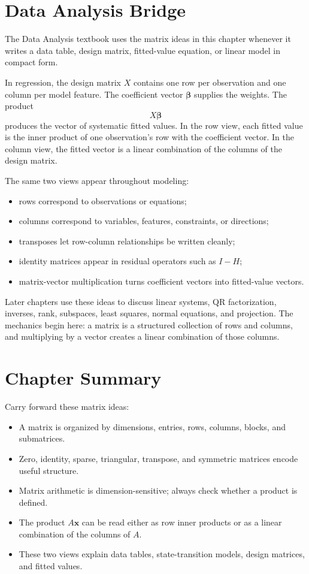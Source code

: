 \section{Data Analysis Bridge}
\label{mf:ch07-data-analysis-bridge}

The Data Analysis textbook uses the matrix ideas in this chapter whenever it writes a data table, design matrix, fitted-value equation, or linear model in compact form.

In regression, the design matrix \(X\) contains one row per observation and one column per model feature. The coefficient vector \(\boldsymbol{\beta}\) supplies the weights. The product
\[
    X\boldsymbol{\beta}
\]
produces the vector of systematic fitted values. In the row view, each fitted value is the inner product of one observation's row with the coefficient vector. In the column view, the fitted vector is a linear combination of the columns of the design matrix.

The same two views appear throughout modeling:
\begin{itemize}
    \item rows correspond to observations or equations;
    \item columns correspond to variables, features, constraints, or directions;
    \item transposes let row-column relationships be written cleanly;
    \item identity matrices appear in residual operators such as \(I-H\);
    \item matrix-vector multiplication turns coefficient vectors into fitted-value vectors.
\end{itemize}

Later chapters use these ideas to discuss linear systems, QR factorization, inverses, rank, subspaces, least squares, normal equations, and projection. The mechanics begin here: a matrix is a structured collection of rows and columns, and multiplying by a vector creates a linear combination of those columns.

\section{Chapter Summary}
\label{mf:matrices-summary}

Carry forward these matrix ideas:
\begin{itemize}
    \item A matrix is organized by dimensions, entries, rows, columns, blocks, and submatrices.
    \item Zero, identity, sparse, triangular, transpose, and symmetric matrices encode useful structure.
    \item Matrix arithmetic is dimension-sensitive; always check whether a product is defined.
    \item The product \(A\mathbf{x}\) can be read either as row inner products or as a linear combination of the columns of \(A\).
    \item These two views explain data tables, state-transition models, design matrices, and fitted values.
\end{itemize}
